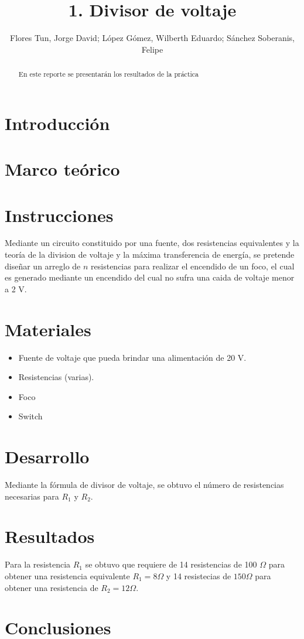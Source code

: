 \documentclass[]{article}
\title{1. Divisor de voltaje}
\author{Flores Tun, Jorge David; López Gómez, Wilberth Eduardo; Sánchez Soberanis, Felipe}
\begin{document}
\maketitle

\begin{abstract}
    En este reporte se presentarán los resultados de la práctica
\end{abstract}

\section{Introducción}



\section{Marco teórico}



\section{Instrucciones}

Mediante un circuito constituido por una fuente, dos resistencias equivalentes y
la teoría de la division de voltaje y la máxima transferencia de energía, se
pretende diseñar un arreglo de $n$ resistencias para realizar el encendido de
un foco, el cual es generado mediante un encendido del cual no sufra una caida
de voltaje menor a 2 V.

\section{Materiales}

\begin{itemize}
    \item Fuente de voltaje que pueda brindar una alimentación de 20 V.
    \item Resistencias (varias).
    \item Foco
    \item Switch
    \end{itemize}


\section{Desarrollo}


Mediante la fórmula de divisor de voltaje, se obtuvo el número de resistencias
necesarias para $R_1$ y $R_2$.

\section{Resultados}

Para la resistencia $R_1$ se obtuvo que requiere de 14 resistencias de 100
$\Omega$ para obtener una resistencia equivalente $R_1 = 8 \Omega$ y 14 resistecias
de $150 \Omega$ para obtener una resistencia de $R_2 = 12 \Omega$.


\section{Conclusiones}


\end{document}
